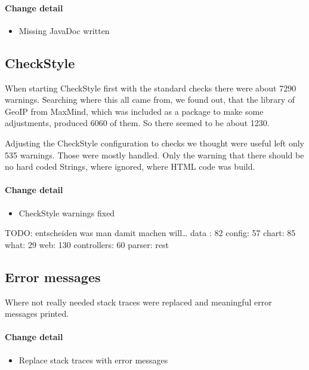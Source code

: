 \paragraph{Change detail}
\begin{itemize}
  \item Missing JavaDoc written
\end{itemize}

\subsection{CheckStyle}\label{cs}
When starting CheckStyle first with the standard checks there were about 7290 warnings.
Searching where this all came from, we found out, that the library of GeoIP from MaxMind, 
which was included as a package to make some adjustments, produced 6060 of them. So there seemed to be about
1230.

Adjusting the CheckStyle configuration to checks we thought were useful left only 535 warnings.
Those were mostly handled. Only the warning that there should be no hard coded Strings, where
ignored, where HTML code was build.

\paragraph{Change detail}
\begin{itemize}
  \item CheckStyle warnings fixed
\end{itemize}
TODO: entscheiden was man damit machen will\ldots
data : 82
config: 57
chart: 85
what: 29
web: 130
controllers: 60 
parser: rest

\subsection{Error messages}
Where not really needed stack traces were replaced and meaningful error messages printed.
\paragraph{Change detail}
\begin{itemize}
  \item Replace stack traces with error messages
\end{itemize}

 
